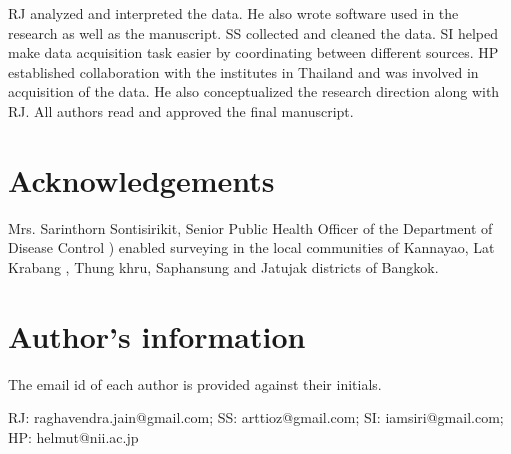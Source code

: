 \documentclass{bmcart}
\begin{document}
\begin{backmatter}
RJ analyzed and interpreted the data. He also wrote software used in the research as well as the manuscript. SS collected and cleaned the data. SI helped make data acquisition task easier by coordinating between different sources. HP established collaboration with the institutes in Thailand and was involved in acquisition of the data. He also conceptualized the research direction along with RJ. All authors read and approved the final manuscript. 
    
      
\section*{Acknowledgements}
Mrs. Sarinthorn Sontisirikit, Senior Public Health Officer of the Department of Disease Control ) enabled surveying in the local communities of Kannayao, Lat Krabang , Thung khru, Saphansung and Jatujak districts of Bangkok.

\section*{Author's information}

The email id of each author is provided against their initials.

RJ: raghavendra.jain@gmail.com;
SS: arttioz@gmail.com; 
SI: iamsiri@gmail.com;
HP: helmut@nii.ac.jp
  

\clearpage

%





\end{backmatter}
\end{document}
